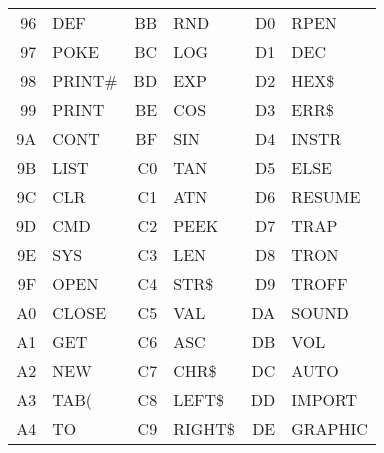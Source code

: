 {\begin{center}
\begin{tabular}{|rp{2.2cm}|rp{2.2cm}|rp{2.2cm}|}
  96 & DEF        &   BB & RND        &   D0 & RPEN       \\
  97 & POKE       &   BC & LOG        &   D1 & DEC        \\
  98 & PRINT\#    &   BD & EXP        &   D2 & HEX\$      \\
  99 & PRINT      &   BE & COS        &   D3 & ERR\$      \\
  9A & CONT       &   BF & SIN        &   D4 & INSTR      \\
  9B & LIST       &   C0 & TAN        &   D5 & ELSE       \\
  9C & CLR        &   C1 & ATN        &   D6 & RESUME     \\
  9D & CMD        &   C2 & PEEK       &   D7 & TRAP       \\
  9E & SYS        &   C3 & LEN        &   D8 & TRON       \\
  9F & OPEN       &   C4 & STR\$      &   D9 & TROFF      \\
  A0 & CLOSE      &   C5 & VAL        &   DA & SOUND      \\
  A1 & GET        &   C6 & ASC        &   DB & VOL        \\
  A2 & NEW        &   C7 & CHR\$      &   DC & AUTO       \\
  A3 & TAB(       &   C8 & LEFT\$     &   DD & IMPORT     \\
  A4 & TO         &   C9 & RIGHT\$    &   DE & GRAPHIC    \\
\hline
\end{tabular}
\end{center}
}
\newpage
